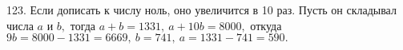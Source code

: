 123. Если дописать к числу ноль, оно увеличится в 10 раз. Пусть он складывал числа $a$ и $b,$ тогда $a+b=1331,\ a+10b=8000,$ откуда $9b=8000-1331=6669,\ b=741,\ a=1331-741=590.$\\
